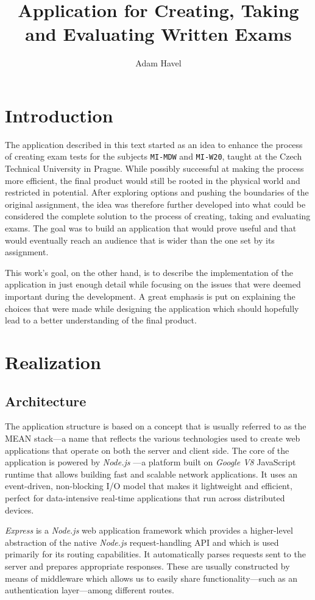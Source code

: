 \documentclass[thesis=M,english,hidelinks]{FITthesis}[2012/10/20]
\title{Application for Creating, Taking and Evaluating Written Exams}
\author{Adam Havel}
\newcommand{\code}{\texttt}
\begin{document}
\chapter{Introduction}

The application described in this text started as an idea to enhance the process of creating exam tests for the subjects \code{MI-MDW} and \code{MI-W20}, taught at the Czech Technical University in Prague. While possibly successful at making the process more efficient, the final product would still be rooted in the physical world and restricted in potential. After exploring options and pushing the boundaries of the original assignment, the idea was therefore further developed into what could be considered the complete solution to the process of creating, taking and evaluating exams. The goal was to build an application that would prove useful and that would eventually reach an audience that is wider than the one set by its assignment.

This work's goal, on the other hand, is to describe the implementation of the application in just enough detail while focusing on the issues that were deemed important during the development. A great emphasis is put on explaining the choices that were made while designing the application which should hopefully lead to a better understanding of the final product.


\chapter{Realization}

  \section{Architecture}

The application structure is based on a concept that is usually referred to as the MEAN stack---a name that reflects the various technologies used to create web applications that operate on both the server and client side. The core of the application is powered by \textit{Node.js} \cite{node}---a platform built on \textit{Google V8} JavaScript runtime that allows building fast and scalable network applications. It uses an event-driven, non-blocking I/O model that makes it lightweight and efficient, perfect for data-intensive real-time applications that run across distributed devices.

\textit{Express} \cite{express} is a \textit{Node.js} web application framework which provides a higher-level abstraction of the native \textit{Node.js} request-handling API and which is used primarily for its routing capabilities. It automatically parses requests sent to the server and prepares appropriate responses. These are usually constructed by means of middleware which allows us to easily share functionality---such as an authentication layer---among different routes.
\end{document}

